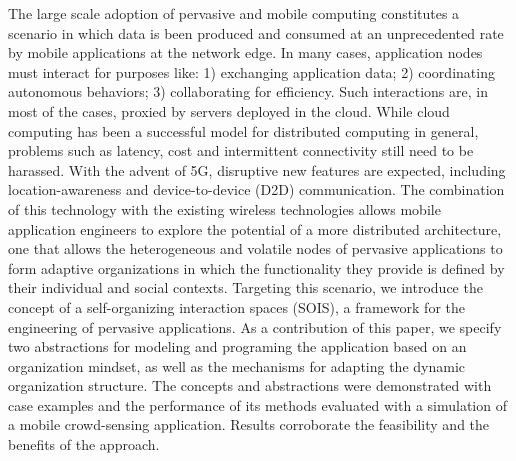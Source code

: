 The large scale adoption of pervasive and mobile computing constitutes a scenario in which data is been produced and consumed at an unprecedented rate by mobile applications at the network edge. In many cases, application nodes must interact for purposes like: 1) exchanging application data; 2) coordinating autonomous behaviors; 3) collaborating for efficiency. 
Such interactions are, in most of the cases, proxied by servers deployed in the cloud. While cloud computing has been a successful model for distributed computing in general, problems such as latency, cost and intermittent connectivity still need to be harassed. With the advent of 5G, disruptive new features are expected, including location-awareness and device-to-device (D2D) communication. The combination of this technology with the existing wireless technologies allows mobile application engineers to explore the potential of a more distributed architecture, one that allows the heterogeneous and volatile nodes of pervasive applications 
to form adaptive organizations in which the functionality they provide is defined by their individual and social contexts. Targeting this scenario, we introduce the concept of a self-organizing interaction spaces (SOIS), a framework for the engineering of pervasive applications. As a contribution of this paper, we specify two abstractions for modeling and programing the application based on an organization mindset, as well as the mechanisms for adapting the dynamic organization structure. 
The concepts and abstractions were demonstrated with case examples and the performance of its methods evaluated with a simulation of a mobile crowd-sensing application. Results corroborate the feasibility and the benefits of the approach. 







